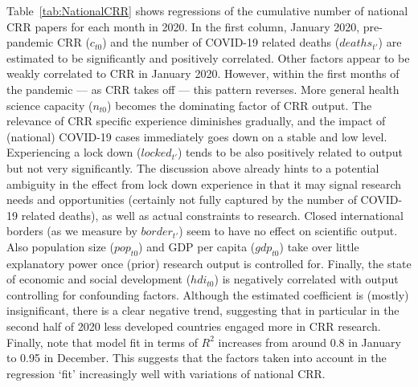 Table~\ref{tab:NationalCRR} shows regressions of the cumulative number of national CRR papers for each month in 2020. In the first column, January 2020, pre-pandemic CRR ($c_{t0}$) and the number of COVID-19 related deaths ($deaths_{t'}$) are estimated to be significantly and positively correlated. Other factors appear to be weakly correlated to CRR in January 2020. However, within the first months of the pandemic --- as CRR takes off --- this pattern reverses. More general health science capacity ($n_{t0}$) becomes the dominating factor of CRR output. The relevance of CRR specific experience diminishes gradually, and the impact of (national) COVID-19 cases immediately goes down on a stable and low level. Experiencing a lock down ($locked_{t'}$) tends to be also positively related to output but not very significantly. The discussion above already hints to a potential ambiguity in the effect from lock down experience in that it may signal research needs and opportunities (certainly not fully captured by the number of COVID-19 related deaths), as well as actual constraints to research. Closed international borders (as we measure by $border_{t'}$) seem to have no effect on scientific output. Also population size ($pop_{t0}$) and GDP per capita ($gdp_{t0}$) take over little explanatory power once (prior) research output is controlled for. Finally, the state of economic and social development ($hdi_{t0}$) is negatively correlated with output controlling for confounding factors. Although the estimated coefficient is (mostly) insignificant, there is a clear negative trend, suggesting that in particular in the second half of 2020 less developed countries engaged more in CRR research. Finally, note that model fit in terms of $R^2$ increases from around 0.8 in January to 0.95 in December. This suggests that the factors taken into account in the regression `fit' increasingly well with variations of national CRR.

